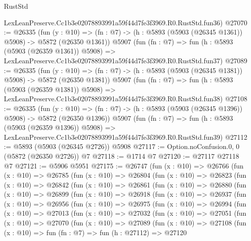 \begin{lexlean}{RustStd}
\begin{coremodule}
    LexLeanPreserve.Cc1b3e02078893991a59f44d7fe3f3969.R0.RustStd.fun36)
@27070 := @26335
    (fun (y : @10) => (fn : @7) -> (h : @5893 (@5903 (@26345 @1361)) @5908) -> @5872 (@26350 @1361))
    @5907
    (fun (fn : @7) =>
    fun (h : @5893 (@5903 (@26359 @1361)) @5908) =>
    LexLeanPreserve.Cc1b3e02078893991a59f44d7fe3f3969.R0.RustStd.fun37)
@27089 := @26335
    (fun (y : @10) => (fn : @7) -> (h : @5893 (@5903 (@26345 @1381)) @5908) -> @5872 (@26350 @1381))
    @5907
    (fun (fn : @7) =>
    fun (h : @5893 (@5903 (@26359 @1381)) @5908) =>
    LexLeanPreserve.Cc1b3e02078893991a59f44d7fe3f3969.R0.RustStd.fun38)
@27108 := @26335
    (fun (y : @10) => (fn : @7) -> (h : @5893 (@5903 (@26345 @1396)) @5908) -> @5872 (@26350 @1396))
    @5907
    (fun (fn : @7) =>
    fun (h : @5893 (@5903 (@26359 @1396)) @5908) =>
    LexLeanPreserve.Cc1b3e02078893991a59f44d7fe3f3969.R0.RustStd.fun39)
@27112 := @5893 (@5903 (@26345 @2726)) @5908
@27117 := Option.noConfusion.{0, 0} (@5872 (@26350 @2726)) @7
@27118 := @1714 @7
@27120 := @27117 @27118 @7
@27121 := @5906 @5951
@27175 := @26747
    (fun (x : @10) =>
    @26766
      (fun (x : @10) =>
      @26785
        (fun (x : @10) =>
        @26804
          (fun (x : @10) =>
          @26823
            (fun (x : @10) =>
            @26842
              (fun (x : @10) =>
              @26861
                (fun (x : @10) =>
                @26880
                  (fun (x : @10) =>
                  @26899
                    (fun (x : @10) =>
                    @26918
                      (fun (x : @10) =>
                      @26937
                        (fun (x : @10) =>
                        @26956
                          (fun (x : @10) =>
                          @26975
                            (fun (x : @10) =>
                            @26994
                              (fun (x : @10) =>
                              @27013
                                (fun (x : @10) =>
                                @27032
                                  (fun (x : @10) =>
                                  @27051
                                    (fun (x : @10) =>
                                    @27070
                                      (fun (x : @10) =>
                                      @27089
                                        (fun (x : @10) =>
                                        @27108
                                          (fun (x : @10) =>
                                          fun (fn : @7) =>
                                          fun (h : @27112) =>
                                          @27120

\end{coremodule}
\end{lexlean}
